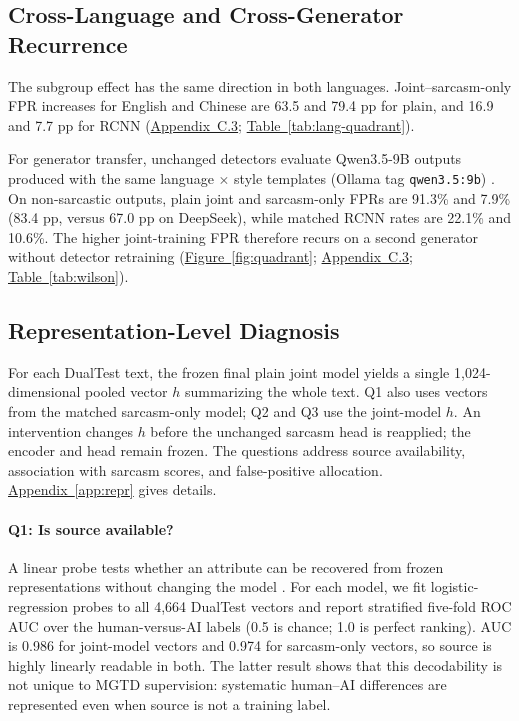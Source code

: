 \documentclass[11pt]{article}
\newcommand{\Appref}[1]{\hyperref[#1]{Appendix~\ref*{#1}}}
\newcommand{\Tabref}[1]{\hyperref[#1]{Table~\ref*{#1}}}
\newcommand{\Figref}[1]{\hyperref[#1]{Figure~\ref*{#1}}}
\begin{document}
\subsection{Cross-Language and Cross-Generator Recurrence}
\label{sec:crossgen}

The subgroup effect has the same direction in both languages. Joint--sarcasm-only FPR increases for English and Chinese are 63.5 and 79.4 pp for plain, and 16.9 and 7.7 pp for RCNN (\hyperref[app:c3]{Appendix~C.3}; \Tabref{tab:lang-quadrant}).

For generator transfer, unchanged detectors evaluate Qwen3.5-9B outputs produced with the same language $\times$ style templates (Ollama tag \texttt{qwen3.5:9b}) \citep{qwen2026qwen35}. On non-sarcastic outputs, plain joint and sarcasm-only FPRs are 91.3\% and 7.9\% (83.4 pp, versus 67.0 pp on DeepSeek), while matched RCNN rates are 22.1\% and 10.6\%. The higher joint-training FPR therefore recurs on a second generator without detector retraining (\Figref{fig:quadrant}; \hyperref[app:c3]{Appendix~C.3}; \Tabref{tab:wilson}).

\subsection{Representation-Level Diagnosis}
\label{sec:mechanism}

For each DualTest text, the frozen final plain joint model yields a single 1{,}024-dimensional pooled vector $h$ summarizing the whole text. Q1 also uses vectors from the matched sarcasm-only model; Q2 and Q3 use the joint-model $h$. An intervention changes $h$ before the unchanged sarcasm head is reapplied; the encoder and head remain frozen. The questions address source availability, association with sarcasm scores, and false-positive allocation. \Appref{app:repr} gives details.

\paragraph{Q1: Is source available?} A linear probe tests whether an attribute can be recovered from frozen representations without changing the model \citep{hewitt2019probes}. For each model, we fit logistic-regression probes to all 4{,}664 DualTest vectors and report stratified five-fold ROC AUC over the human-versus-AI labels (0.5 is chance; 1.0 is perfect ranking). AUC is 0.986 for joint-model vectors and 0.974 for sarcasm-only vectors, so source is highly linearly readable in both. The latter result shows that this decodability is not unique to MGTD supervision: systematic human--AI differences are represented even when source is not a training label.
\end{document}
